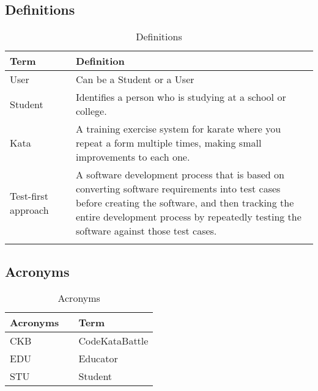 \subsection{Definitions}
\begin{table}[H]
    \centering
    \renewcommand{\arraystretch}{1.5}
    \begin{tabular}{l l p{11.5cm}}
        \hline
        \textbf{Term}       &  & \textbf{Definition}                                                                                                                                                                                                                          \\
        \hline
        User                &  & Can be a Student or a User                                                                                                                                                                                                                                             \\
        Student             &  & Identifies a person who is studying at a school or college.                                                                                                                                                                                  \\
        Kata                &  & A training exercise system for karate where you repeat a form multiple times, making small improvements to each one.                                                                                                                         \\
        Test-first approach &  & A software development process that is based on converting software requirements into test cases before creating the software, and then tracking the entire development process by repeatedly testing the software against those test cases. \\                                                                                                                                                          \\
        \hline
    \end{tabular}
    \caption{Definitions}
\end{table}

\subsection{Acronyms}
\begin{table}[H]
    \centering
    \renewcommand{\arraystretch}{1.5}
    \begin{tabular}{l l p{11cm}}
        \hline
        \textbf{Acronyms} &  & \textbf{Term}  \\
        \hline
        CKB               &  & CodeKataBattle \\
        EDU               &  & Educator       \\
        STU               &  & Student        \\
        \hline
    \end{tabular}
    \caption{Acronyms}
\end{table}

